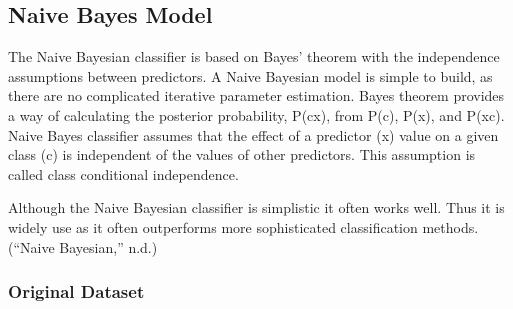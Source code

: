 \documentclass[
]{article}
\newenvironment{Shaded}{\begin{snugshade}}{\end{snugshade}}
\newcommand{\CommentTok}[1]{\textcolor[rgb]{0.56,0.35,0.01}{\textit{#1}}}
\newcommand{\DataTypeTok}[1]{\textcolor[rgb]{0.13,0.29,0.53}{#1}}
\newcommand{\KeywordTok}[1]{\textcolor[rgb]{0.13,0.29,0.53}{\textbf{#1}}}
\newcommand{\NormalTok}[1]{#1}
\newcommand{\OperatorTok}[1]{\textcolor[rgb]{0.81,0.36,0.00}{\textbf{#1}}}
\newcommand{\OtherTok}[1]{\textcolor[rgb]{0.56,0.35,0.01}{#1}}
\newcommand{\StringTok}[1]{\textcolor[rgb]{0.31,0.60,0.02}{#1}}
\begin{document}
\hypertarget{naive-bayes-model}{%
\subsection{Naive Bayes Model}\label{naive-bayes-model}}

The Naive Bayesian classifier is based on Bayes' theorem with the
independence assumptions between predictors. A Naive Bayesian model is
simple to build, as there are no complicated iterative parameter
estimation. Bayes theorem provides a way of calculating the posterior
probability, P(c\textbar x), from P(c), P(x), and P(x\textbar c). Naive
Bayes classifier assumes that the effect of a predictor (x) value on a
given class (c) is independent of the values of other predictors. This
assumption is called class conditional independence.

Although the Naive Bayesian classifier is simplistic it often works
well. Thus it is widely use as it often outperforms more sophisticated
classification methods. (``Naive Bayesian,'' n.d.)

\hypertarget{original-dataset-1}{%
\subsubsection{Original Dataset}\label{original-dataset-1}}

\begin{Shaded}
\end{Shaded}
\end{document}

